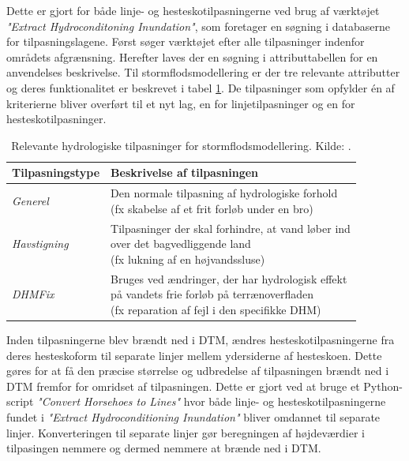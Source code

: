 Dette er gjort for både linje- og hesteskotilpasningerne ved brug af værktøjet \textit{"Extract Hydroconditoning Inundation"}, som foretager en søgning i databaserne for tilpasningslagene. Først søger værktøjet efter alle tilpasninger indenfor områdets afgrænsning. Herefter laves der en søgning i attributtabellen for en anvendelses beskrivelse. Til stormflodsmodellering er der tre relevante attributter og deres funktionalitet er beskrevet i tabel \ref{Tabel: Relevante hydrologiske tilpasninger}. De tilpasninger som opfylder én af kriterierne bliver overført til et nyt lag, en for linjetilpasninger og en for hesteskotilpasninger. 
\begin{table}[H]
\centering
\renewcommand{\arraystretch}{1.5}
\begin{threeparttable}
\caption{Relevante hydrologiske tilpasninger for stormflodsmodellering. Kilde: \cite{GeoDanmark_HydroLag}.}
\label{Tabel: Relevante hydrologiske tilpasninger}
\begin{tabular}{@{} l l @{}} 
\toprule
\textbf{Tilpasningstype} & \textbf{Beskrivelse af tilpasningen} \\
\midrule
\textit{Generel} &
  \makecell[l]{Den normale tilpasning af hydrologiske forhold\\
  (fx skabelse af et frit forløb under en bro)} \\
\addlinespace
\textit{Havstigning} &
  \makecell[l]{Tilpasninger der skal forhindre, at vand løber ind\\
  over det bagvedliggende land\\
  (fx lukning af en højvandssluse)} \\
\addlinespace
\textit{DHMFix} &
  \makecell[l]{Bruges ved ændringer, der har hydrologisk effekt\\
  på vandets frie forløb på terrænoverfladen\\
  (fx reparation af fejl i den specifikke DHM)} \\
\bottomrule
\end{tabular}
\end{threeparttable}
\end{table}
\newpage
Inden tilpasningerne blev brændt ned i DTM, ændres hesteskotilpasningerne fra deres hesteskoform til separate linjer mellem ydersiderne af hesteskoen. Dette gøres for at få den præcise størrelse og udbredelse af tilpasningen brændt ned i DTM fremfor for omridset af tilpasningen. Dette er gjort ved at bruge et Python-script \textit{"Convert Horsehoes to Lines"} hvor både linje- og hesteskotilpasningerne fundet i \textit{"Extract Hydroconditioning Inundation"} bliver omdannet til separate linjer. Konverteringen til separate linjer gør beregningen af højdeværdier i tilpasingen nemmere og dermed nemmere at brænde ned i DTM.\\
